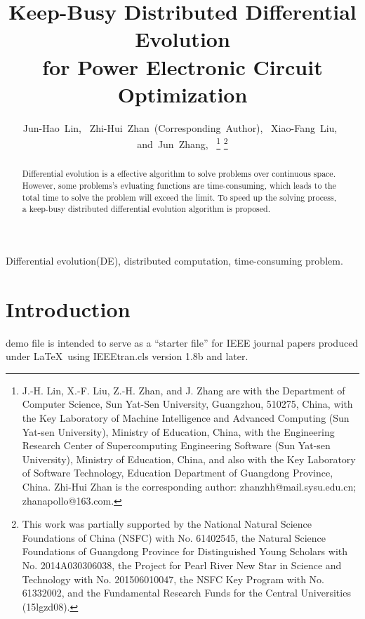 \documentclass[journal]{IEEEtran}
\begin{document}
\title{Keep-Busy Distributed Differential Evolution \\for Power Electronic Circuit Optimization}

\author{
	Jun-Hao~Lin,~
	Zhi-Hui~Zhan~(Corresponding~Author),~
	Xiao-Fang~Liu,~
	and~Jun~Zhang,~%
	\thanks{
		J.-H. Lin, X.-F. Liu, Z.-H. Zhan, and J. Zhang are with the Department of
		Computer Science, Sun Yat-Sen University, Guangzhou, 510275, China,
		with the Key Laboratory of Machine Intelligence and Advanced Computing
		(Sun Yat-sen University), Ministry of Education, China, with the
		Engineering Research Center of Supercomputing Engineering Software (Sun
		Yat-sen University), Ministry of Education, China, and also with the Key
		Laboratory of Software Technology, Education Department of Guangdong
		Province, China. Zhi-Hui Zhan is the corresponding author:
		zhanzhh@mail.sysu.edu.cn; zhanapollo@163.com.
	}%
	\thanks{
		This work was partially supported by the National Natural Science
		Foundations of China (NSFC) with No. 61402545, the Natural Science
		Foundations of Guangdong Province for Distinguished Young Scholars with
		No. 2014A030306038, the Project for Pearl River New Star in Science and
		Technology with No. 201506010047, the NSFC Key Program with No.
		61332002, and the Fundamental Research Funds for the Central Universities
		(15lgzd08).
	}
}

\maketitle



\begin{abstract}
	Differential evolution is a effective algorithm to solve problems over continuous space.
	However, some problems's evluating functions are time-consuming, which leads to the total time to
	solve the problem will exceed the limit. To speed up the solving process, 
	a keep-busy distributed differential evolution algorithm is proposed.
\end{abstract}

\begin{IEEEkeywords}
	Differential evolution(DE), distributed computation, time-consuming problem.
\end{IEEEkeywords}


\section{Introduction}
 demo file is intended to serve as a ``starter file''
for IEEE journal papers produced under \LaTeX\ using
IEEEtran.cls version 1.8b and later.
\end{document}
